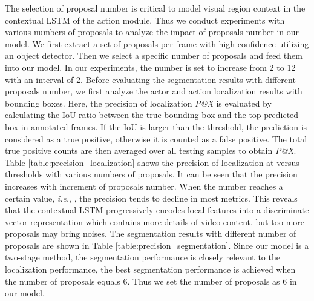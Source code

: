 \documentclass[journal]{IEEEtran}
\begin{document}
The selection of proposal number is critical to model visual region context in the contextual LSTM of the action module. Thus we conduct experiments with various numbers of proposals to analyze the impact of proposals number in our model. We first extract a set of proposals per frame with high confidence utilizing an object detector. Then we select a specific number of proposals and feed them into our model. In our experiments, the number is set to increase from 2 to 12 with an interval of 2. Before evaluating the segmentation results with different proposals number, we first analyze the actor and action localization results with bounding boxes. Here, the precision of localization \emph{P@X}  is evaluated by calculating the IoU ratio between the true bounding box and the top predicted box in annotated frames. If the IoU is larger than the threshold, the prediction is considered as a true positive, otherwise it is counted as a false positive. The total true positive counts are then averaged over all testing samples to obtain \emph{P@X}. Table \ref{table:precision_localization} shows the precision of localization at versus thresholds with various numbers of proposals. It can be seen that the precision increases with increment of proposals number. When the number reaches a certain value, \emph{i.e.}, , the precision tends to decline in most metrics. This reveals that the contextual LSTM progressively encodes local features into a discriminate vector representation which contains more details of video content, but too more proposals may bring noises. The segmentation results with different number of proposals are shown in Table \ref{table:precision_segmentation}. Since our model is a two-stage method, the segmentation performance is closely relevant to the localization performance, the best segmentation performance is achieved when the number of proposals equals 6. Thus we set the number of proposals as 6 in our model.
\end{document}
